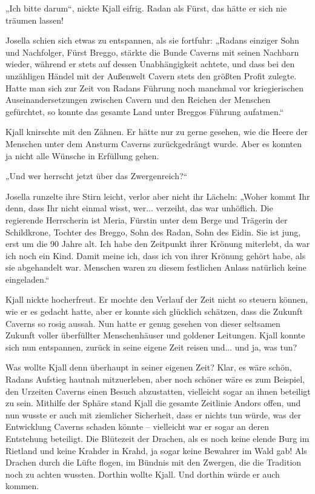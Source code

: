 „Ich bitte darum“, nickte Kjall eifrig. Radan als Fürst, das hätte er sich nie träumen lassen!

Josella schien sich etwas zu entspannen, als sie fortfuhr: „Radans einziger Sohn und Nachfolger, Fürst Breggo, stärkte die Bunde Caverns mit seinen Nachbarn wieder, während er stets auf dessen Unabhängigkeit achtete, und dass bei den unzähligen Händel mit der Außenwelt Cavern stets den größten Profit zulegte. Hatte man sich zur Zeit von Radans Führung noch manchmal vor kriegierischen Auseinandersetzungen zwischen Cavern und den Reichen der Menschen gefürchtet, so konnte das gesamte Land unter Breggos Führung aufatmen.“

Kjall knirschte mit den Zähnen. Er hätte nur zu gerne gesehen, wie die Heere der Menschen unter dem Ansturm Caverns zurückgedrängt wurde. Aber es konnten ja nicht alle Wünsche in Erfüllung gehen.

„Und wer herrscht jetzt über das Zwergenreich?“

Josella runzelte ihre Stirn leicht, verlor aber nicht ihr Lächeln: „Woher kommt Ihr denn, dass Ihr nicht einmal wisst, wer... verzeiht, das war unhöflich. Die regierende Herrscherin ist Meria, Fürstin unter dem Berge und Trägerin der Schildkrone, Tochter des Breggo, Sohn des Radan, Sohn des Eidin. Sie ist jung, erst um die 90 Jahre alt. Ich habe den Zeitpunkt ihrer Krönung miterlebt, da war ich noch ein Kind. Damit meine ich, dass ich von ihrer Krönung gehört habe, als sie abgehandelt war. Menschen waren zu diesem festlichen Anlass natürlich keine eingeladen.“

Kjall nickte hocherfreut. Er mochte den Verlauf der Zeit nicht so steuern können, wie er es gedacht hatte, aber er konnte sich glücklich schätzen, dass die Zukunft Caverns so rosig aussah. Nun hatte er genug gesehen von dieser seltsamen Zukunft voller überfüllter Menschenhäuser und goldener Leitungen. Kjall konnte sich nun entspannen, zurück in seine eigene Zeit reisen und... und ja, was tun?

Was wollte Kjall denn überhaupt in seiner eigenen Zeit? Klar, es wäre schön, Radans Aufstieg hautnah mitzuerleben, aber noch schöner wäre es zum Beispiel, den Urzeiten Caverns einen Besuch abzustatten, vielleicht sogar an ihnen beteiligt zu sein. Mithilfe der Sphäre stand Kjall die gesamte Zeitlinie Andors offen, und nun wusste er auch mit ziemlicher Sicherheit, dass er nichts tun würde, was der Entwicklung Caverns schaden könnte – vielleicht war er sogar an deren Entstehung beteiligt. Die Blütezeit der Drachen, als es noch keine elende Burg im Rietland und keine Krahder in Krahd, ja sogar keine Bewahrer im Wald gab! Als Drachen durch die Lüfte flogen, im Bündnis mit den Zwergen, die die Tradition noch zu achten wussten. Dorthin wollte Kjall. Und dorthin würde er auch kommen.

